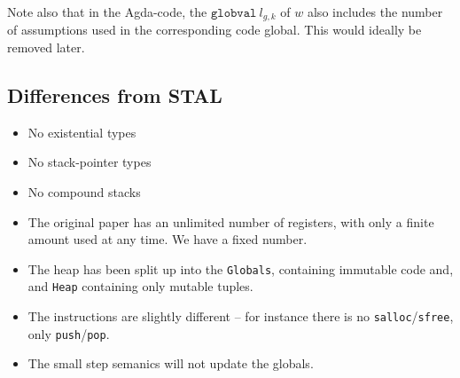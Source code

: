 Note also that in the Agda-code, the $\mathtt{globval}\ l_{g,k}$ of $w$ also
includes the number of assumptions used in the corresponding code global. This
would ideally be removed later.

\subsection{Differences from STAL}

\begin{itemize}
\item No existential types
\item No stack-pointer types
\item No compound stacks
\item The original paper has an unlimited number of registers, with only a
  finite amount used at any time. We have a fixed number.
\item The heap has been split up into the \texttt{Globals}, containing immutable
  code and, and \texttt{Heap} containing only mutable tuples.
\item The instructions are slightly different -- for instance there is no \texttt{salloc}/\texttt{sfree}, only \texttt{push}/\texttt{pop}.
\item The small step semanics will not update the globals.
\end{itemize}
